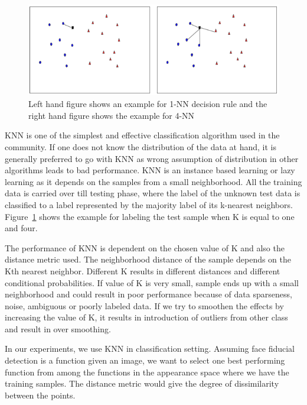 


\begin{figure}
    \centering
    \includegraphics[width=5in, height=1.6in]{concepts/figures/knn.png}
    \caption{Left hand figure shows an example for 1-NN decision rule and the right hand figure shows the example for 4-NN}
    \label{fig:sample_knn_example}
\end{figure}

KNN is one of the simplest and effective classification algorithm used in the community. 
If one does not know the distribution of the data at hand, it is generally preferred to go 
with KNN as wrong assumption of distribution in other algorithms leads to bad performance.
KNN is an instance based learning or lazy learning as it depends on the samples from a 
small neighborhood. All the training data is carried over till testing phase, where the 
label of the unknown test data is classified to a label represented by the majority label
of its k-nearest neighbors. Figure~\ref{fig:sample_knn_example} shows the example for labeling the test sample when
K is equal to one and four.

The performance of KNN is dependent on the chosen value of K and also the distance metric
used. The neighborhood distance of the sample depends on the Kth nearest neighbor. 
Different K results in different distances and different conditional probabilities. If value
of K is very small, sample ends up with a small neighborhood and could result in poor
performance because of data sparseness, noise, ambiguous or poorly labeled data. If we
try to smoothen the effects by increasing the value of K, it results in introduction of 
outliers from other class and result in over smoothing.

In our experiments, we use KNN in classification setting. Assuming face fiducial detection
is a function given an image, we want to select one best performing function from among the 
functions in the appearance space where we have the training samples. The distance metric 
would give the degree of dissimilarity between the points.
